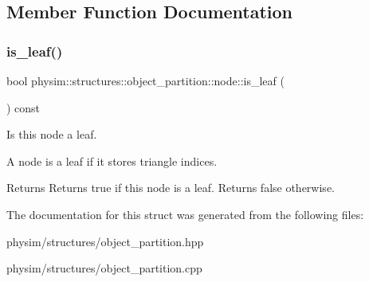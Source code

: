 \subsection{Member Function Documentation}
\mbox{\label{structphysim_1_1structures_1_1object__partition_1_1node_a050a9a5a4fce3e677a524cba652d8ab9}} 
\subsubsection{\texorpdfstring{is\+\_\+leaf()}{is\_leaf()}}
{\footnotesize\ttfamily bool physim\+::structures\+::object\+\_\+partition\+::node\+::is\+\_\+leaf (\begin{DoxyParamCaption}{ }\end{DoxyParamCaption}) const}



Is this node a leaf. 

A node is a leaf if it stores triangle indices. \begin{DoxyReturn}{Returns}
Returns true if this node is a leaf. Returns false otherwise. 
\end{DoxyReturn}


The documentation for this struct was generated from the following files\+:\begin{DoxyCompactItemize}
\item 
physim/structures/object\+\_\+partition.\+hpp\item 
physim/structures/object\+\_\+partition.\+cpp\end{DoxyCompactItemize}
